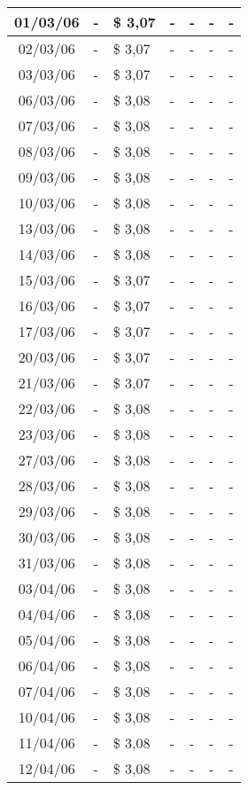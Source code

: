 \begin{center}
\begin{longtable}{|c|p{1.5cm}|p{1.5cm}|p{1.5cm}|p{1.5cm}|p{1.5cm}|p{1.5cm}|}
01/03/06 & - & \$ 3,07 & - & - & - & - \\ \hline
02/03/06 & - & \$ 3,07 & - & - & - & - \\ \hline
03/03/06 & - & \$ 3,07 & - & - & - & - \\ \hline
06/03/06 & - & \$ 3,08 & - & - & - & - \\ \hline
07/03/06 & - & \$ 3,08 & - & - & - & - \\ \hline
08/03/06 & - & \$ 3,08 & - & - & - & - \\ \hline
09/03/06 & - & \$ 3,08 & - & - & - & - \\ \hline
10/03/06 & - & \$ 3,08 & - & - & - & - \\ \hline
13/03/06 & - & \$ 3,08 & - & - & - & - \\ \hline
14/03/06 & - & \$ 3,08 & - & - & - & - \\ \hline
15/03/06 & - & \$ 3,07 & - & - & - & - \\ \hline
16/03/06 & - & \$ 3,07 & - & - & - & - \\ \hline
17/03/06 & - & \$ 3,07 & - & - & - & - \\ \hline
20/03/06 & - & \$ 3,07 & - & - & - & - \\ \hline
21/03/06 & - & \$ 3,07 & - & - & - & - \\ \hline
22/03/06 & - & \$ 3,08 & - & - & - & - \\ \hline
23/03/06 & - & \$ 3,08 & - & - & - & - \\ \hline
27/03/06 & - & \$ 3,08 & - & - & - & - \\ \hline
28/03/06 & - & \$ 3,08 & - & - & - & - \\ \hline
29/03/06 & - & \$ 3,08 & - & - & - & - \\ \hline
30/03/06 & - & \$ 3,08 & - & - & - & - \\ \hline
31/03/06 & - & \$ 3,08 & - & - & - & - \\ \hline
03/04/06 & - & \$ 3,08 & - & - & - & - \\ \hline
04/04/06 & - & \$ 3,08 & - & - & - & - \\ \hline
05/04/06 & - & \$ 3,08 & - & - & - & - \\ \hline
06/04/06 & - & \$ 3,08 & - & - & - & - \\ \hline
07/04/06 & - & \$ 3,08 & - & - & - & - \\ \hline
10/04/06 & - & \$ 3,08 & - & - & - & - \\ \hline
11/04/06 & - & \$ 3,08 & - & - & - & - \\ \hline
12/04/06 & - & \$ 3,08 & - & - & - & - \\ \hline

\end{longtable}
\end{center}

